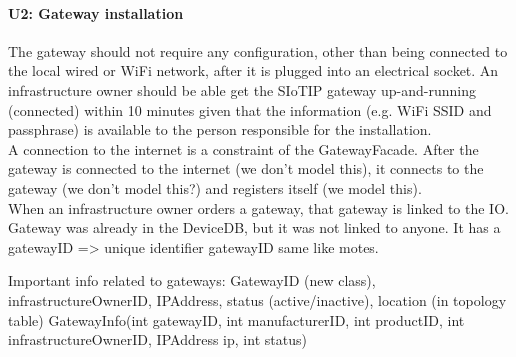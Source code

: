 
    \paragraph{U2: Gateway installation}
        The gateway should not require any configuration, other than being connected
        to the local wired or WiFi network, after it is plugged into an electrical
        socket. An infrastructure owner should be able get the SIoTIP gateway
        up-and-running (connected) within 10 minutes given that the information
        (e.g. WiFi SSID and passphrase) is available to the person responsible for
        the installation. \\

        A connection to the internet is a constraint of the GatewayFacade.
        After the gateway is connected to the internet (we don't model this),
        it connects to the gateway (we don't model this?) and registers itself (we model this). \\
        When an infrastructure owner orders a gateway, that gateway is linked to the IO.
        Gateway was already in the DeviceDB, but it was not linked to anyone. It has a gatewayID => unique identifier gatewayID same like motes.

        Important info related to gateways: GatewayID (new class), infrastructureOwnerID, IPAddress, status (active/inactive), location (in topology table)
            GatewayInfo(int gatewayID, int manufacturerID, int productID, int infrastructureOwnerID, IPAddress ip, int status)

